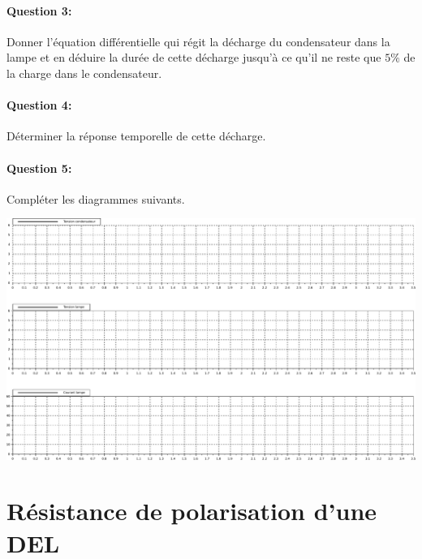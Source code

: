 \paragraph{Question 3:} Donner l'équation différentielle qui régit la décharge du condensateur dans la lampe et en déduire la durée de cette décharge jusqu'à ce qu'il ne reste que $5\%$ de la charge dans le condensateur.

\paragraph{Question 4:} Déterminer la réponse temporelle de cette décharge.

\paragraph{Question 5:} Compléter les diagrammes suivants.

\begin{center}
\includegraphics[width=0.9\linewidth]{img/Flash_results_vide}
\end{center}

\newpage

\section{Résistance de polarisation d'une DEL}

